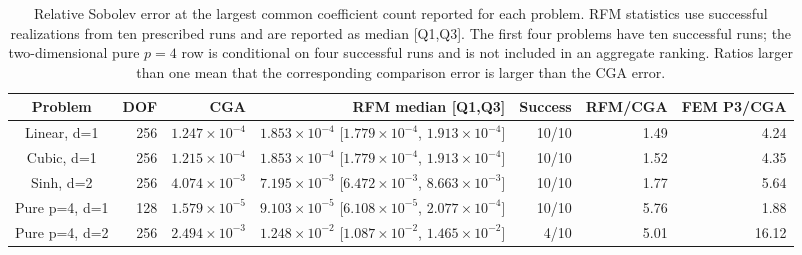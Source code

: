 \begin{table}[!htbp]
\centering\scriptsize
\caption{Relative Sobolev error at the largest common coefficient count reported for each problem. RFM statistics use successful realizations from ten prescribed runs and are reported as median [Q1,Q3]. The first four problems have ten successful runs; the two-dimensional pure \(p=4\) row is conditional on four successful runs and is not included in an aggregate ranking. Ratios larger than one mean that the corresponding comparison error is larger than the CGA error.}
\label{tab:baseline-terminal}
\begin{tabular}{@{}crrrrrr@{}}
\toprule
Problem & DOF & CGA & RFM median [Q1,Q3] & Success & RFM/CGA & FEM P3/CGA \\ \midrule
Linear, d=1 & 256 & $1.247\!\times\!10^{-4}$ & $1.853\!\times\!10^{-4}$ [$1.779\!\times\!10^{-4}$, $1.913\!\times\!10^{-4}$] & 10/10 & 1.49 & 4.24 \\
Cubic, d=1 & 256 & $1.215\!\times\!10^{-4}$ & $1.853\!\times\!10^{-4}$ [$1.779\!\times\!10^{-4}$, $1.913\!\times\!10^{-4}$] & 10/10 & 1.52 & 4.35 \\
Sinh, d=2 & 256 & $4.074\!\times\!10^{-3}$ & $7.195\!\times\!10^{-3}$ [$6.472\!\times\!10^{-3}$, $8.663\!\times\!10^{-3}$] & 10/10 & 1.77 & 5.64 \\
Pure p=4, d=1 & 128 & $1.579\!\times\!10^{-5}$ & $9.103\!\times\!10^{-5}$ [$6.108\!\times\!10^{-5}$, $2.077\!\times\!10^{-4}$] & 10/10 & 5.76 & 1.88 \\
Pure p=4, d=2 & 256 & $2.494\!\times\!10^{-3}$ & $1.248\!\times\!10^{-2}$ [$1.087\!\times\!10^{-2}$, $1.465\!\times\!10^{-2}$] & 4/10 & 5.01 & 16.12 \\
\bottomrule
\end{tabular}
\end{table}
